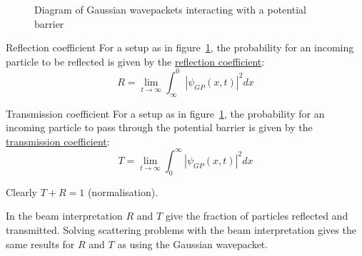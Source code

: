 \documentclass[../Main.tex]{subfiles}
\begin{document}
\begin{figure}
    \caption{Diagram of Gaussian wavepackets interacting with a potential barrier}
    \label{figPotentialBarrier}
\end{figure}
\begin{definition}{Reflection coefficient}
    For a setup as in figure~\ref{figPotentialBarrier}, the probability for an incoming particle to be reflected is given by the \underline{reflection coefficient}:
    \begin{equation}
        R = \lim_{t \to \infty} \int_{\infty}^{0} |\psi_{GP}(x, t)|^2 dx 
        \label{eqnReflecCoefft}
    \end{equation}
\end{definition}
\begin{definition}{Transmission coefficient}
    For a setup as in figure~\ref{figPotentialBarrier}, the probability for an incoming particle to pass through the potential barrier is given by the \underline{transmission coefficient}:
    \begin{equation}
        T = \lim_{t \to \infty} \int_{0}^{\infty} |\psi_{GP}(x, t)|^2 dx 
        \label{eqnTransmCoefft}
    \end{equation}
\end{definition}
Clearly $T + R = 1$ (normalisation).

In the beam interpretation $R$ and $T$ give the fraction of particles reflected and transmitted. Solving scattering problems with the beam interpretation gives the same results for $R$ and $T$ as using the Gaussian wavepacket.
\end{document}
